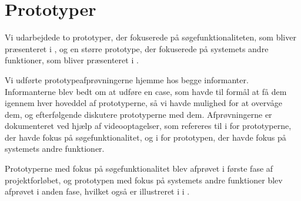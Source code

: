 \section{Prototyper}
\label{sec:prototyper}

Vi udarbejdede to prototyper, der fokuserede på søgefunktionaliteten, som bliver præsenteret i , og en større prototype, der fokuserede på systemets andre funktioner, som bliver præsenteret i .

Vi udførte prototypeafprøvningerne hjemme hos begge informanter.  Informanterne blev bedt om at udføre en case, som havde til formål at få dem igennem hver hoveddel af prototyperne, så vi havde mulighed for at overvåge dem, og efterfølgende diskutere prototyperne med dem. Afprøvningerne er dokumenteret ved hjælp af videooptagelser, som refereres til i  for prototyperne, der havde fokus på søgefunktionalitet, og i  for prototypen, der havde fokus på systemets andre funktioner.

Prototyperne med fokus på søgefunktionalitet blev afprøvet i første fase af projektforløbet, og prototypen med fokus på systemets andre funktioner blev afprøvet i anden fase, hvilket også er illustreret i  i .




